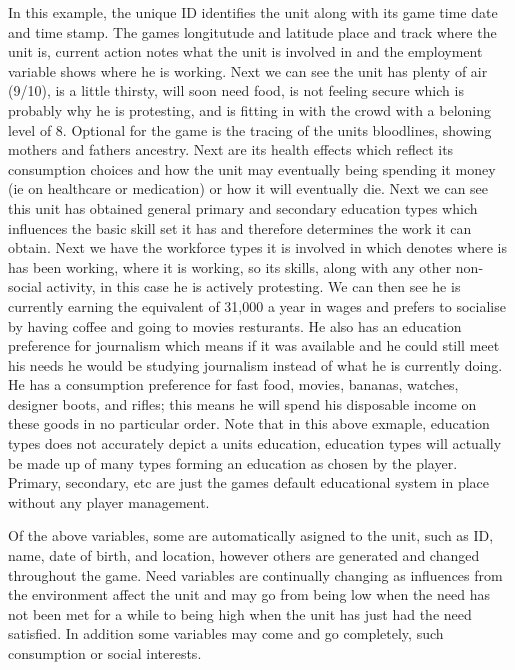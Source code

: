 In this example, the unique ID identifies the unit along with its game time date and time stamp. The games longitutude and latitude place and track where the unit is, current action notes what the unit is involved in and the employment variable shows where he is working.
 Next we can see the unit has plenty of air (9/10), is a little thirsty, will soon need food, is not feeling secure which is probably why he is protesting, and is fitting in with the crowd with a beloning level of 8. Optional for the game is the tracing of the units bloodlines, showing mothers and fathers ancestry. Next are its health effects which reflect its consumption choices and how the unit may eventually being spending it money (ie on healthcare or medication) or how it will eventually die. Next we can see this unit has obtained general primary and secondary education types which influences the basic skill set it has and therefore determines the work it can obtain. Next we have the workforce types it is involved in which denotes where is has been working, where it is working, so its skills, along with any other non-social activity, in this case he is actively protesting. We can then see he is currently earning the equivalent of 31,000 a year in wages and prefers to socialise by having coffee and going to movies resturants. He also has an education preference for journalism which means if it was available and he could still meet his needs he would be studying journalism instead of what he is currently doing. He has 
a consumption preference for fast food, movies, bananas, watches, designer boots, and rifles; this means he will spend his disposable income on these goods in no particular order. Note that in this above exmaple, education types does not accurately depict a units education, education types will actually be made up of many types forming an education as chosen by the player. Primary, secondary, etc are just the games default educational system in place without any player management.
	

Of the above variables, some are automatically asigned to the unit, such as ID, name, date of birth, and location, however others are generated and changed throughout the game. Need variables are continually changing as influences from the environment affect the unit and may go from being low when the need has not been met for a while to being high when the unit has just had the need satisfied. In addition some variables may come and go completely, such consumption or social interests. 

